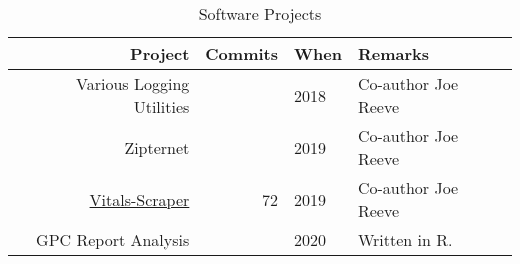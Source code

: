 \begin{table}[htpb]
    \centering
    \footnotesize
    \begin{tabular}{r|r|l|l}
    Project &Commits  &When &Remarks\\
     \hline
     Various Logging Utilities&  &2018 &Co-author Joe Reeve \\
     Zipternet &  &2019  &Co-author Joe Reeve \\
    \href{https://github.com/commercetest/vitals-scraper/}{Vitals-Scraper} &72 &2019 &Co-author Joe Reeve \\
    GPC Report Analysis & &2020 &Written in R. \\
    
    \end{tabular}
    \caption{Software Projects}
    \label{tab:software}
\end{table}
